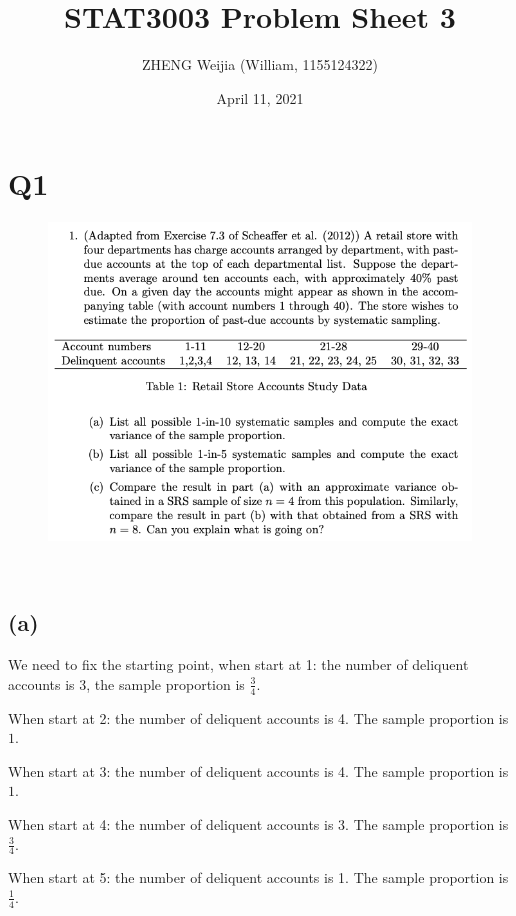 \documentclass[12pt]{article}%
\begin{document}
\title{STAT3003 Problem Sheet 3}
\author{ZHENG Weijia (William, 1155124322)}
\date{April 11, 2021}
\maketitle


\section{Q1}
\begin{figure}[htp]
    \centering %
    \includegraphics[width = 15cm]{img/Q1.png}
\end{figure}

~\

\subsection{(a)}
We need to fix the starting point, when start at 1: the number of deliquent accounts is 3, 
the sample proportion is $\frac{3}{4}.$ 

When start at 2: the number of deliquent accounts is 4. The sample proportion is $1.$

When start at 3: the number of deliquent accounts is 4. The sample proportion is $1.$ 

When start at 4: the number of deliquent accounts is 3. The sample proportion is $\frac{3}{4}.$ 

When start at 5: the number of deliquent accounts is 1. The sample proportion is $\frac{1}{4}.$ 
\end{document}
